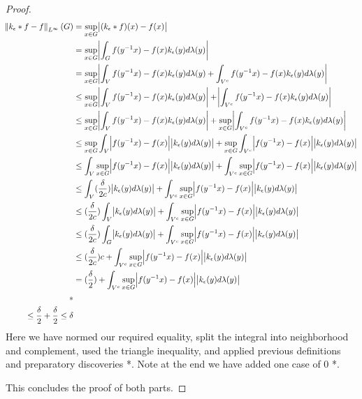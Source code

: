 \begin{proof}
\begin{align*}
\norm{k_\epsilon \ast f -f}_{L^\infty}(G) &= \sup_{x\in G} \abs{(k_\epsilon \ast f)(x)-f(x)} \\
&= \sup_{x\in G} \abs{\int_G f(y^{-1}x)-f(x) k_\epsilon(y) d\lambda(y)}\\
&= \sup_{x\in G} \abs{\int_V f(y^{-1}x)-f(x) k_\epsilon(y) d\lambda(y) + \int_{V^c} f(y^{-1}x)-f(x) k_\epsilon(y) d\lambda(y)}\\
&\leq \sup_{x\in G} \abs{\int_V f(y^{-1}x)-f(x) k_\epsilon(y) d\lambda(y)} + \abs{\int_{V^c} f(y^{-1}x)-f(x) k_\epsilon(y) d\lambda(y)} \\
&\leq \sup_{x\in G} \abs{\int_V f(y^{-1}x)-f(x) k_\epsilon(y) d\lambda(y)} + \sup_{x\in G} \abs{\int_{V^c} f(y^{-1}x)-f(x) k_\epsilon(y) d\lambda(y)} \\
&\leq \sup_{x\in G} \int_V \abs{f(y^{-1}x)-f(x)}\abs{ k_\epsilon(y) d\lambda(y)} + \sup_{x\in G} \int_{V^c}\abs{ f(y^{-1}x)-f(x)}\abs{ k_\epsilon(y) d\lambda(y)}\\
&\leq  \int_V \sup_{x\in G}\abs{f(y^{-1}x)-f(x)}\abs{ k_\epsilon(y) d\lambda(y)} +  \int_{V^c}\sup_{x\in G}\abs{ f(y^{-1}x)-f(x)}\abs{ k_\epsilon(y) d\lambda(y)}\\
&\leq  \int_V (\frac{\delta}{2c}) \abs{ k_\epsilon(y) d\lambda(y)} +  \int_{V^c}\sup_{x\in G}\abs{ f(y^{-1}x)-f(x)}\abs{ k_\epsilon(y) d\lambda(y)}\\
&\leq (\frac{\delta}{2c}) \int_V  \abs{ k_\epsilon(y) d\lambda(y)} +  \int_{V^c}\sup_{x\in G}\abs{ f(y^{-1}x)-f(x)}\abs{ k_\epsilon(y) d\lambda(y)}\\
&\leq (\frac{\delta}{2c}) \int_G  \abs{ k_\epsilon(y) d\lambda(y)} +  \int_{V^c}\sup_{x\in G}\abs{ f(y^{-1}x)-f(x)}\abs{ k_\epsilon(y) d\lambda(y)}\\
&\leq (\frac{\delta}{2c}) c +  \int_{V^c}\sup_{x\in G}\abs{ f(y^{-1}x)-f(x)}\abs{ k_\epsilon(y) d\lambda(y)}\\
&= (\frac{\delta}{2}) +  \int_{V^c}\sup_{x\in G}\abs{ f(y^{-1}x)-f(x)}\abs{ k_\epsilon(y) d\lambda(y)}\\
*\\
\leq \frac{\delta}{2} + \frac{\delta}{2}
\leq \delta
\end{align*}
Here we have normed our required equality, split the integral into neighborhood and complement, used the triangle inequality,   and applied previous definitions and preparatory discoveries *. Note at the end we have added one case of 0 *.

This concludes the proof of both parts.
\end{proof}

